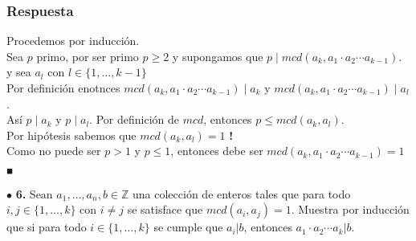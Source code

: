 \documentclass[12pt]{article}
\begin{document}
	\subsubsection*{Respuesta}
	Procedemos por inducción.\\
	
	Sea $p$ primo, por ser primo $p \geq 2$ y supongamos que $p \mid mcd(a_k , a_1  \cdot a_2 \cdots a_{k-1})$.
	y sea $a_l$ con $l \in \{1, \dots, k -1 \}$\\
	
	Por definición enotnces $mcd(a_k , a_1  \cdot a_2 \cdots a_{k-1}) \mid a_k$ y $mcd(a_k , a_1  \cdot a_2 \cdots a_{k-1}) \mid a_l$.\\
	
	Así $p \mid a_k$ y $p \mid a_l$. Por definición de $mcd$, entonces $p \leq mcd(a_k, a_l)$.\\
	
	Por hipótesis sabemos que $mcd(a_k, a_l) = 1$ \textbf{!}\\
	
	Como no puede ser $p > 1$ y $p \leq 1$, entonces debe ser $mcd(a_k , a_1  \cdot a_2 \cdots a_{k-1}) = 1$ $_\blacksquare$
	
	\vspace{1cm}
	
	$\bullet$ \textbf{6.} Sean $a_1, \dots, a_n, b \in \mathbb{Z}$ una colección de enteros tales que para todo $i, j \in \{1, \dots, k\}$ con $i \neq j$
	se satisface que $mcd(a_i, a_j ) = 1$. Muestra por inducción que si para todo $i \in \{1, \dots, k \}$ se cumple que $a_i |b$, entonces
	$a_1 \cdot a_2 \cdots a_k |b$.
	
\end{document}

